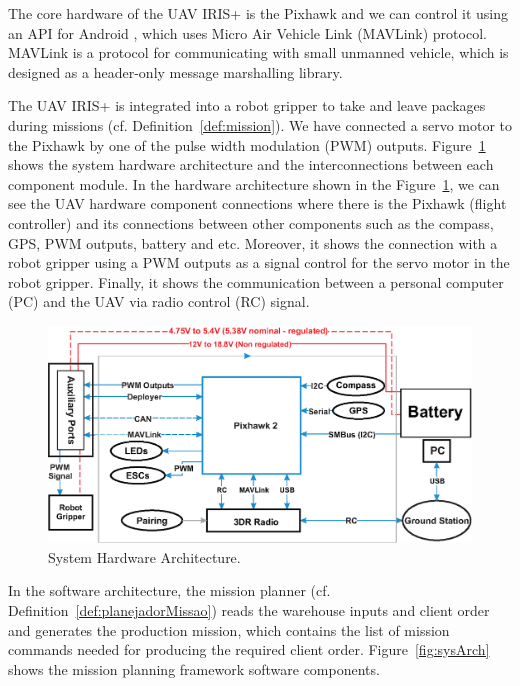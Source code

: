 \documentclass[12pt]{article}
\begin{document}

The core hardware of the UAV IRIS+ is the Pixhawk and we can control it using an API for Android \cite{dronekit}, which uses Micro Air Vehicle Link (MAVLink) protocol. MAVLink is a protocol for communicating with small unmanned vehicle, which is designed as a header-only message marshalling library.

The UAV IRIS+ is integrated into a robot gripper to take and leave packages during missions (cf. Definition~\ref{def:mission}). We have connected a servo motor to the Pixhawk by one of the pulse width modulation (PWM) outputs. Figure~\ref{fig:hardArch} shows the system hardware architecture and the interconnections between each component module. In the hardware architecture shown in the Figure~\ref{fig:hardArch}, we can see the UAV hardware component connections where there is the Pixhawk (flight controller) and its connections between other components such as the compass, GPS, PWM outputs, battery and etc. Moreover, it shows the connection with a robot gripper using a PWM outputs as a signal control for the servo motor in the robot gripper. Finally, it shows the communication between a personal computer (PC) and the UAV via radio control (RC) signal.
%
\begin{figure}[H]
	\centering
	\includegraphics[width=\columnwidth]{arquiteturaIHW.eps}
	\caption{System Hardware Architecture.}
	\label{fig:hardArch}
\end{figure}

In the software architecture, the mission planner (cf. Definition~\ref{def:planejadorMissao}) reads the warehouse inputs and client order and generates the production mission, which contains the list of mission commands needed for producing the required client order. Figure~\ref{fig:sysArch} shows the mission planning framework software components.
\end{document}
